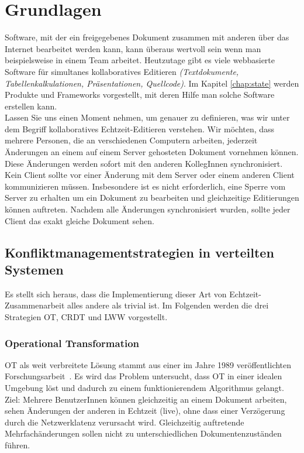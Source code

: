 \chapter{\label{chap:grundlagen}Grundlagen}
Software, mit der ein freigegebenes Dokument zusammen mit anderen über das Internet bearbeitet werden kann, kann überaus wertvoll sein wenn man beispielsweise in einem Team arbeitet. Heutzutage gibt es viele webbasierte Software für simultanes kollaboratives Editieren \textit{(Textdokumente, Tabellenkalkulationen, Präsentationen, Quellcode)}. Im Kapitel \ref{chap:state} werden Produkte und Frameworks vorgestellt, mit deren Hilfe man solche Software erstellen kann.\\
Lassen Sie uns einen Moment nehmen, um genauer zu definieren, was wir unter dem Begriff kollaboratives Echtzeit-Editieren verstehen.
Wir möchten, dass mehrere Personen, die an verschiedenen Computern arbeiten, jederzeit Änderungen an einem auf einem Server gehosteten Dokument vornehmen können. Diese Änderungen werden sofort mit den anderen KollegInnen synchronisiert. Kein Client sollte vor einer Änderung mit dem Server oder einem anderen Client kommunizieren müssen. Insbesondere ist es nicht erforderlich, eine Sperre vom Server zu erhalten um ein Dokument zu bearbeiten und gleichzeitige Editierungen können auftreten. Nachdem alle Änderungen synchronisiert wurden, sollte jeder Client das exakt gleiche Dokument sehen.
%
%
\section{Konfliktmanagementstrategien in verteilten Systemen}
Es stellt sich heraus, dass die Implementierung dieser Art von Echtzeit-Zusammenarbeit alles andere als trivial ist.
Im Folgenden werden die drei Strategien \gls{OT}, \gls{CRDT} und \gls{LWW} vorgestellt.
%
%
\subsection{Operational Transformation}
\gls{OT} als weit verbreitete Lösung stammt aus einer im Jahre 1989 veröffentlichten Forschungsarbeit~\cite{ot_paper}.
Es wird das Problem untersucht, dass \gls{OT} in einer idealen Umgebung löst und dadurch zu einem funktionierendem Algorithmus gelangt.\\
Ziel: Mehrere BenutzerInnen können gleichzeitig an einem Dokument arbeiten, sehen Änderungen der anderen in Echtzeit (live), ohne dass einer Verzögerung durch die Netzwerklatenz verursacht wird. Gleichzeitig auftretende Mehrfachänderungen sollen nicht zu unterschiedlichen Dokumentenzuständen führen.
